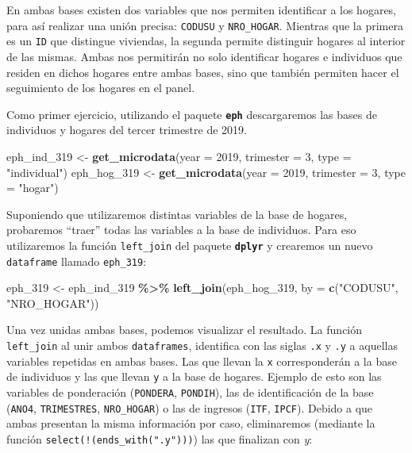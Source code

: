 \documentclass[
]{article}
\newenvironment{Shaded}{\begin{snugshade}}{\end{snugshade}}
\newcommand{\AttributeTok}[1]{\textcolor[rgb]{0.13,0.29,0.53}{#1}}
\newcommand{\DecValTok}[1]{\textcolor[rgb]{0.00,0.00,0.81}{#1}}
\newcommand{\FunctionTok}[1]{\textcolor[rgb]{0.13,0.29,0.53}{\textbf{#1}}}
\newcommand{\NormalTok}[1]{#1}
\newcommand{\OtherTok}[1]{\textcolor[rgb]{0.56,0.35,0.01}{#1}}
\newcommand{\SpecialCharTok}[1]{\textcolor[rgb]{0.81,0.36,0.00}{\textbf{#1}}}
\newcommand{\StringTok}[1]{\textcolor[rgb]{0.31,0.60,0.02}{#1}}
\begin{document}
En ambas bases existen dos variables que nos permiten identificar a los hogares, para así realizar una unión precisa: \texttt{CODUSU} y \texttt{NRO\_HOGAR}. Mientras que la primera es un \texttt{ID} que distingue viviendas, la segunda permite distinguir hogares al interior de las mismas. Ambas nos permitirán no solo identificar hogares e individuos que residen en dichos hogares entre ambas bases, sino que también permiten hacer el seguimiento de los hogares en el panel.

Como primer ejercicio, utilizando el paquete \textbf{\texttt{eph}} descargaremos las bases de individuos y hogares del tercer trimestre de 2019.

\begin{Shaded}
\begin{Highlighting}[]
\NormalTok{eph\_ind\_319 }\OtherTok{\textless{}{-}} \FunctionTok{get\_microdata}\NormalTok{(}\AttributeTok{year =} \DecValTok{2019}\NormalTok{, }\AttributeTok{trimester =} \DecValTok{3}\NormalTok{, }\AttributeTok{type =} \StringTok{"individual"}\NormalTok{)}
\NormalTok{eph\_hog\_319 }\OtherTok{\textless{}{-}} \FunctionTok{get\_microdata}\NormalTok{(}\AttributeTok{year =} \DecValTok{2019}\NormalTok{, }\AttributeTok{trimester =} \DecValTok{3}\NormalTok{, }\AttributeTok{type =} \StringTok{"hogar"}\NormalTok{)}
\end{Highlighting}
\end{Shaded}

Suponiendo que utilizaremos distintas variables de la base de hogares, probaremos ``traer'' todas las variables a la base de individuos. Para eso utilizaremos la función \texttt{left\_join} del paquete \textbf{\texttt{dplyr}} y crearemos un nuevo \texttt{dataframe} llamado \texttt{eph\_319}:

\begin{Shaded}
\begin{Highlighting}[]
\NormalTok{eph\_319 }\OtherTok{\textless{}{-}}\NormalTok{ eph\_ind\_319 }\SpecialCharTok{\%\textgreater{}\%}
    \FunctionTok{left\_join}\NormalTok{(eph\_hog\_319, }\AttributeTok{by =} \FunctionTok{c}\NormalTok{(}\StringTok{"CODUSU"}\NormalTok{, }\StringTok{"NRO\_HOGAR"}\NormalTok{))}
\end{Highlighting}
\end{Shaded}

Una vez unidas ambas bases, podemos visualizar el resultado. La función \texttt{left\_join} al unir ambos \texttt{dataframes}, identifica con las siglas \texttt{.x} y \texttt{.y} a aquellas variables repetidas en ambas bases. Las que llevan la \texttt{x} corresponderán a la base de individuos y las que llevan \texttt{y} a la base de hogares. Ejemplo de esto son las variables de ponderación (\texttt{PONDERA}, \texttt{PONDIH}), las de identificación de la base (\texttt{ANO4}, \texttt{TRIMESTRES}, \texttt{NRO\_HOGAR}) o las de ingresos (\texttt{ITF}, \texttt{IPCF}). Debido a que ambas presentan la misma información por caso, eliminaremos (mediante la función \texttt{select(!(ends\_with(".y")))}) las que finalizan con \emph{y}:
\end{document}
